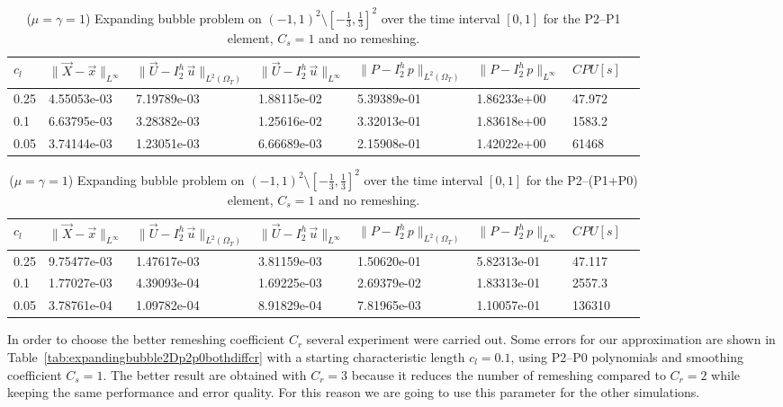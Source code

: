 \documentclass[a4paper,12pt,onecolumn]{article}
\newcommand{\errorXx}{\|\vec{X} - \vec{x}\|_{L^\infty}}
\newcommand{\LerrorUu}[1]{\|\vec U - I^h_{#1}\,\vec u\|_{L^2(\Omega_T)}}
\newcommand{\errorUu}[1]{\|\vec U - I^h_{#1}\,\vec u\|_{L^\infty}}
\newcommand{\errorPp}[1]{\|P - I^h_{#1}\,p\|_{L^\infty}}
\newcommand{\LerrorPp}[1]{\|P - I^h_{#1}\,p\|_{L^2(\Omega_T)}}
\begin{document}
\begin{table}
 \center
 \hspace*{-2cm}
\begin{tabular}{llllllll}
\hline
$c_l$ & $\errorXx$ & $\LerrorUu2$ & $\errorUu2$ & $\LerrorPp2$ & $\errorPp2$ & $CPU[s]$ \\
\hline
0.25 & 4.55053e-03 & 7.19789e-03 & 1.88115e-02 & 5.39389e-01 & 1.86233e+00 & 47.972\\
0.1 & 6.63795e-03 & 3.28382e-03 & 1.25616e-02 & 3.32013e-01 & 1.83618e+00 & 1583.2\\
0.05 & 3.74144e-03 & 1.23051e-03 & 6.66689e-03 & 2.15908e-01 & 1.42022e+00 & 61468\\
\hline
\end{tabular}
\hspace*{-2cm}
\caption{($\mu=\gamma=1$) Expanding bubble problem on $(-1,1)^2\setminus[-\frac{1}{3},\frac{1}{3}]^2$ over the time interval $[0,1]$ for the P2--P1 element, $C_s=1$ and no remeshing.}
\label{tab:expandingbubble2Dp2p1smooth}
\end{table}

\begin{table}
 \center
 \hspace*{-2cm}
\begin{tabular}{llllllll}
\hline
$c_l$ & $\errorXx$ & $\LerrorUu2$ & $\errorUu2$ & $\LerrorPp2$ & $\errorPp2$ & $CPU[s]$\\
\hline
0.25 & 9.75477e-03 & 1.47617e-03 & 3.81159e-03 & 1.50620e-01 & 5.82313e-01 & 47.117\\
0.1 & 1.77027e-03 & 4.39093e-04 & 1.69225e-03 & 2.69379e-02 & 1.83313e-01 & 2557.3\\
0.05 & 3.78761e-04 & 1.09782e-04 & 8.91829e-04 & 7.81965e-03 & 1.10057e-01 & 136310\\
\hline
\end{tabular}
\hspace*{-2cm}
\caption{($\mu=\gamma=1$) Expanding bubble problem on $(-1,1)^2\setminus[-\frac{1}{3},\frac{1}{3}]^2$ over the time interval $[0,1]$ for the P2--(P1+P0) element, $C_s=1$ and no remeshing.}
\label{tab:expandingbubble2Dp2p1p0smooth}
\end{table}

In order to choose the better remeshing coefficient $C_r$ several experiment were carried out. Some errors for our approximation are shown in Table~\ref{tab:expandingbubble2Dp2p0bothdiffcr} with a starting characteristic length $c_l=0.1$, using P2--P0 polynomials and smoothing coefficient $C_s=1$. The better result are obtained with $C_r=3$ because it reduces the number of remeshing compared to $C_r=2$ while keeping the same performance and error quality. For this reason we are going to use this parameter for the other simulations.
\end{document}
